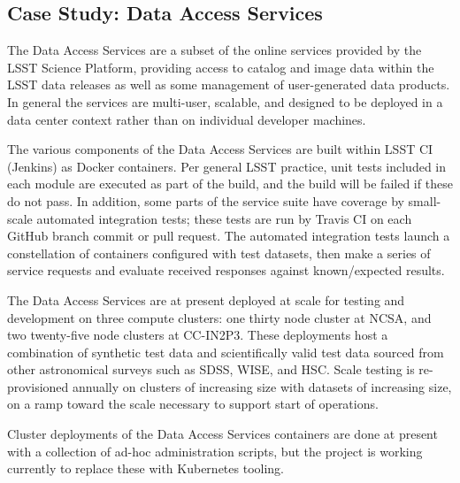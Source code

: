 \subsection{Case Study: Data Access Services}

The Data Access Services are a subset of the online services provided by the LSST Science Platform, providing
access to catalog and image data within the LSST data releases as well as some management of user-generated
data products.  In general the services are multi-user, scalable, and designed to be deployed in a data
center context rather than on individual developer machines.

The various components of the Data Access Services are built within LSST CI (Jenkins) as Docker containers.
Per general LSST practice, unit tests included in each module are executed as part of the build, and the build
will be failed if these do not pass.  In addition, some parts of the service suite have coverage by small-
scale automated integration tests; these tests are run by Travis CI on each GitHub branch commit or pull
request.  The automated integration tests launch a constellation of containers configured with test datasets,
then make a series of service requests and evaluate received responses against known/expected results.

The Data Access Services are at present deployed at scale for testing and development on three compute
clusters: one thirty node cluster at NCSA, and two twenty-five node clusters at CC-IN2P3.  These deployments
host a combination of synthetic test data and scientifically valid test data sourced from other astronomical
surveys such as SDSS, WISE, and HSC.  Scale testing is re-provisioned annually on clusters of increasing size
with datasets of increasing size, on a ramp toward the scale necessary to support start of operations.

Cluster deployments of the Data Access Services containers are done at present with a collection of ad-hoc
administration scripts, but the project is working currently to replace these with Kubernetes tooling.


